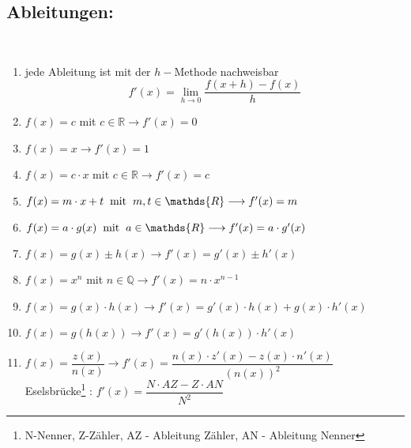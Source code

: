 \documentclass[a4paper,twocolumn,10pt]{onepgnote1}
\begin{document}
\subsection{Ableitungen:}\\
\begin{enumerate}
\item jede Ableitung ist mit der $h-$Methode nachweisbar $$f'(x) = \lim \limits_{h\longrightarrow 0} \frac{f(x+h) - f(x)}{h}$$
\item $f(x)= c$ mit $c \in\mathds{R} \longrightarrow f'(x) = 0$\hfill\\
\item $f(x)= x  \longrightarrow f'(x) = 1$\\
\item $f(x) = c\cdot x $ mit $c\in\mathds{R}\longrightarrow f'(x) = c$ \\
\item $f(x) = m\cdot x + t  \hspace{0.2cm}\text{mit} \hspace{0.2cm} m,t \in \mathds{R}\longrightarrow f'(x) = m$\\
\item $f(x) = a\cdot g(x)\hspace{0.2cm}\text{mit} \hspace{0.2cm} a \in \mathds{R} \longrightarrow f'(x) = a\cdot g'(x)$ \\
\item $f(x)= g(x) \pm h(x) \longrightarrow f'(x) = g'(x)\pm h'(x)$\\
\item $f(x) = x^n$ mit $n\in \mathds{Q} \longrightarrow f'(x) = n\cdot x^{n-1}$\\
\item $f(x) = g(x) \cdot h(x) \longrightarrow f'(x) = g'(x) \cdot h(x) + g(x) \cdot h'(x)$\\
\item $f(x) = g(h(x)) \longrightarrow f'(x) = g'(h(x)) \cdot h'(x)$\\
\item $f(x) = \dfrac{z(x)}{n(x)} \longrightarrow f'(x) = \dfrac{n(x)\cdot z'(x) - z(x) \cdot n'(x)}{(n(x))^2}$\\ Eselsbrücke\footnote{N-Nenner, Z-Zähler, AZ - Ableitung Zähler, AN - Ableitung Nenner} : $f'(x)=\dfrac{N\cdot AZ-Z\cdot AN}{N^2}$
\end{enumerate}
\end{document}
